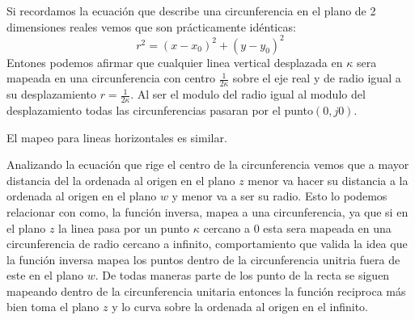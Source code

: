  Si recordamos la ecuación que describe una circunferencia en el plano de 2 dimensiones reales vemos que son prácticamente idénticas:
 \begin{equation}
     r^2=(x-x_0)^2+(y-y_0)^2
 \end{equation}
 Entones podemos afirmar que cualquier linea vertical desplazada en $\kappa$ sera mapeada en una circunferencia con centro $\frac{1}{2\kappa}$ sobre el eje real y de radio igual a su desplazamiento $r=\frac{1}{2\kappa}$. Al ser el modulo del radio igual al modulo del desplazamiento todas las circunferencias pasaran por el punto$(0,j0)$. 
\begin{figure}[H]
\centering
    \begin{minipage}{0.4\textwidth}
    \centering
       
    \end{minipage}
   \begin{minipage}{0.41\textwidth}
    \centering
       
    \end{minipage}
    \caption{}
    \label{fig:InvFV1}
\end{figure}
El mapeo para lineas horizontales es similar.
\begin{figure}[H]
\centering
    \begin{minipage}{0.4\textwidth}
    \centering
       
    \end{minipage}
   \begin{minipage}{0.41\textwidth}
    \centering
       
    \end{minipage}
    \caption{}
    \label{fig:InvFV2}
\end{figure}
 Analizando la ecuación que rige el centro de la circunferencia vemos que a mayor distancia del la ordenada al origen en el plano $z$ menor va hacer su distancia a la ordenada al origen en el plano $w$ y menor va a ser su radio. Esto lo podemos relacionar con como, la función inversa, mapea a una circunferencia, ya que si en el plano $z$ la linea pasa por un punto $\kappa$ cercano a $0$ esta sera mapeada en una circunferencia de radio cercano a infinito, comportamiento que valida la idea que la función inversa mapea los puntos dentro de la circunferencia unitria fuera de este en el plano $w$. De todas maneras parte de los punto de la recta se siguen mapeando dentro de la circunferencia unitaria entonces la función reciproca más bien toma el plano $z$ y lo curva sobre la ordenada al origen en el infinito.
 \begin{figure}[H]
     \centering
     
 \end{figure}

